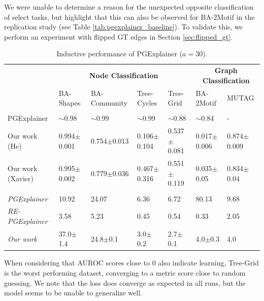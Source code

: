 We were unable to determine a reason for the unexpected opposite classification of select tasks, but highlight that this can also be observed for BA-2Motif in the replication study \cite{holdijk2021re} (see Table \ref{tab:pgexplainer_baseline}). To validate this, we perform an experiment with flipped \ac{GT} edges in Section \ref{sec:flipped_gt}. \bigskip

\begin{table}[ht]
    \centering
    \scriptsize
    \begin{tabularx}{\textwidth}{l|XXXX|XX}   %
    \multicolumn{1}{c}{\textbf{}} & \multicolumn{4}{c}{\textbf{Node Classification}} & \multicolumn{2}{c}{\textbf{Graph Classification}} \\
    \textbf{} & BA-Shapes & BA-Community & Tree-Cycles & Tree-Grid & BA-2Motif & MUTAG \\
    \midrule
    \addlinespace
    \multicolumn{7}{c}{\textbf{Explanation AUROC}} \\
    \midrule
    PGExplainer & $\sim$0.98 & $\sim$0.99 & $\sim$0.99 & $\sim$0.88 & $\sim$0.84 & - \\
    Our work (He) & 0.994$\pm$0.001 & 0.754$\pm$0.013 & 0.106$\pm$0.104 & 0.537$\pm$0.081 & 0.017$\pm$0.006 & 0.874$\pm$0.009 \\
    Our work (Xavier) & 0.995$\pm$0.002 & 0.779$\pm$0.036 & 0.467$\pm$0.316 & 0.551$\pm$0.119 & 0.035$\pm$0.05 & 0.834$\pm$0.04 \\
    \midrule
    \addlinespace
    \multicolumn{7}{c}{\textbf{Inference Time (ms)}} \\
    \midrule
    \textit{PGExplainer} & 10.92 & 24.07 & 6.36 & 6.72 & 80.13 & 9.68 \\
    \textit{RE-PGExplainer} & 3.58 & 5.23 & 0.45 & 0.54 & 0.33 & 2.05 \\
    \textit{Our work} & 37.0$\pm$1.4 & 24.8$\pm$0.1 & 3.0$\pm$0.2 & 2.7$\pm$0.1 & 4.0$\pm$0.3 & 4.0 \\
    \end{tabularx}
    \caption[Inductive performance of our reimplementation]{Inductive performance of PGExplainer ($a=30$).}
    \label{tab:pgexplainer_auc}
\end{table}

When considering that AUROC scores close to 0 also indicate learning, Tree-Grid is the worst performing dataset, converging to a metric score close to random guessing. We note that the loss does converge as expected in all runs, but the model seems to be unable to generalize well.

